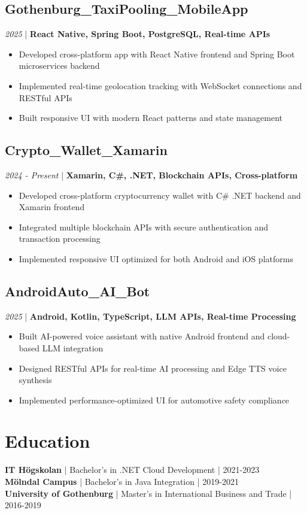 \documentclass[11pt,a4paper]{article}
\begin{document}
\subsection*{Gothenburg\_TaxiPooling\_MobileApp}
\textit{2025} | \textbf{React Native, Spring Boot, PostgreSQL, Real-time APIs}
\begin{itemize}[noitemsep]
\item Developed cross-platform app with React Native frontend and Spring Boot microservices backend
\item Implemented real-time geolocation tracking with WebSocket connections and RESTful APIs
\item Built responsive UI with modern React patterns and state management
\end{itemize}

\subsection*{Crypto\_Wallet\_Xamarin}
\textit{2024 - Present} | \textbf{Xamarin, C\#, .NET, Blockchain APIs, Cross-platform}
\begin{itemize}[noitemsep]
\item Developed cross-platform cryptocurrency wallet with C\# .NET backend and Xamarin frontend
\item Integrated multiple blockchain APIs with secure authentication and transaction processing
\item Implemented responsive UI optimized for both Android and iOS platforms
\end{itemize}

\subsection*{AndroidAuto\_AI\_Bot}
\textit{2025} | \textbf{Android, Kotlin, TypeScript, LLM APIs, Real-time Processing}
\begin{itemize}[noitemsep]
\item Built AI-powered voice assistant with native Android frontend and cloud-based LLM integration
\item Designed RESTful APIs for real-time AI processing and Edge TTS voice synthesis
\item Implemented performance-optimized UI for automotive safety compliance
\end{itemize}

\section*{Education}
\textbf{IT Högskolan} | Bachelor's in .NET Cloud Development | 2021-2023\\
\textbf{Mölndal Campus} | Bachelor's in Java Integration | 2019-2021\\
\textbf{University of Gothenburg} | Master's in International Business and Trade | 2016-2019
\end{document}
